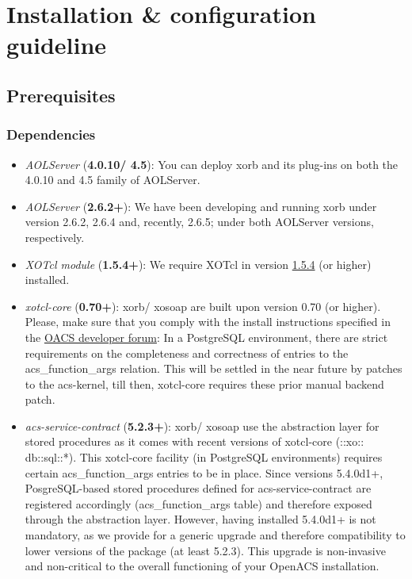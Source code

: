      \section{Installation \& configuration guideline}\label{sec:installation}
     	\subsection{Prerequisites}
	\subsubsection{Dependencies}
	\begin{itemize}
	\item \emph{AOLServer} (\textbf{4.0.10/ 4.5}): You can deploy xorb and its plug-ins on both the 4.0.10 and 4.5 family of AOLServer.
	\item \emph{AOLServer} (\textbf{2.6.2+}): We have been developing and running xorb under version 2.6.2, 2.6.4 and, recently, 2.6.5; under both AOLServer versions, respectively.
	\item \emph{XOTcl module} (\textbf{1.5.4+}): We require XOTcl in version \href{http://media.wu-wien.ac.at/download/xotcl-1.5.4.tar.gz}{1.5.4} (or higher) installed.
	\item \emph{xotcl-core} (\textbf{0.70+}): xorb/ xosoap are built upon version 0.70 (or higher).
	 Please, make sure that you comply with the install instructions specified in the \href{http://openacs.org/forums/message-view?message_id=1165990}{OACS developer forum}: In a PostgreSQL environment, there are strict requirements on the completeness and correctness of entries to the acs\_function\_args relation. This will be settled in the near future by patches to the acs-kernel, till then, xotcl-core requires these prior manual backend patch.
	\item \emph{acs-service-contract} (\textbf{5.2.3+}): xorb/ xosoap use the abstraction layer for stored procedures as it comes with recent versions of xotcl-core (::xo:: db::sql::*). This xotcl-core facility (in PostgreSQL environments) requires certain acs\_function\_args entries to be in place. Since versions 5.4.0d1+, PosgreSQL-based stored procedures defined for acs-service-contract  are registered accordingly (acs\_function\_args table) and therefore exposed through the abstraction layer. However, having installed 5.4.0d1+ is not mandatory, as we provide for a generic upgrade and therefore compatibility to lower versions of the package (at least 5.2.3). This upgrade is non-invasive and non-critical to the overall functioning of your OpenACS installation.
	\end{itemize}
